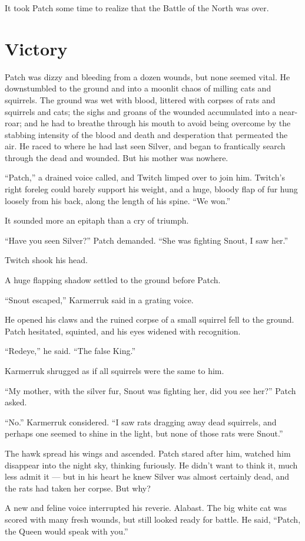 \documentclass[ebook,oneside,openany,17pt]{memoir}
\renewcommand{\thechapter}{\Roman{chapter}}
\newcounter{sections}
\newcommand{\sections}[1]{%
  \section*{#1}
  \addtocounter{sections}{1}%
  \pdfbookmark[1]{#1}{section.\thechapter.\thesections}}
\begin{document}
It took Patch some time to realize that the Battle of the North was
over.


\sections{Victory}

Patch was dizzy and bleeding from a dozen wounds, but none seemed
vital. He downstumbled to the ground and into a moonlit chaos of
milling cats and squirrels. The ground was wet with blood, littered
with corpses of rats and squirrels and cats; the sighs and groans of
the wounded accumulated into a near-roar; and he had to breathe
through his mouth to avoid being overcome by the stabbing intensity of
the blood and death and desperation that permeated the air. He raced
to where he had last seen Silver, and began to frantically search
through the dead and wounded. But his mother was nowhere.

“Patch,” a drained voice called, and Twitch limped over to join
him. Twitch’s right foreleg could barely support his weight, and a
huge, bloody flap of fur hung loosely from his back, along the length
of his spine. “We won.”

It sounded more an epitaph than a cry of triumph.

“Have you seen Silver?” Patch demanded. “She was fighting Snout, I saw
her.”

Twitch shook his head.

A huge flapping shadow settled to the ground before Patch.

“Snout escaped,” Karmerruk said in a grating voice.

He opened his claws and the ruined corpse of a small squirrel fell to
the ground. Patch hesitated, squinted, and his eyes widened with
recognition.

“Redeye,” he said. “The false King.”

Karmerruk shrugged as if all squirrels were the same to him.

“My mother, with the silver fur, Snout was fighting her, did you see
her?” Patch asked.

“No.” Karmerruk considered. “I saw rats dragging away dead squirrels,
and perhaps one seemed to shine in the light, but none of those rats
were Snout.”

The hawk spread his wings and ascended. Patch stared after him,
watched him disappear into the night sky, thinking furiously. He
didn’t want to think it, much less admit it — but in his heart he knew
Silver was almost certainly dead, and the rats had taken her
corpse. But why?

A new and feline voice interrupted his reverie. Alabast. The big white
cat was scored with many fresh wounds, but still looked ready for
battle. He said, “Patch, the Queen would speak with you.”
\end{document}
